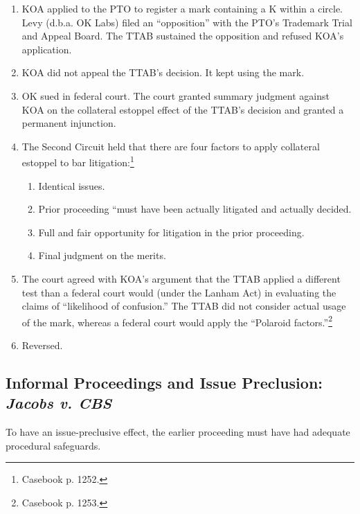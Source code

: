 \begin{enumerate}
    \item KOA applied to the PTO to register a mark containing a K within a 
    circle. Levy (d.b.a. OK Labs) filed an ``opposition'' with the PTO's 
    Trademark Trial and Appeal Board. The TTAB sustained the opposition and 
    refused KOA's application.
    \item KOA did not appeal the TTAB's decision. It kept using the mark.
    \item OK sued in federal court. The court granted summary judgment against 
    KOA on the collateral estoppel effect of the TTAB's decision and granted a 
    permanent injunction.
    \item The Second Circuit held that there are four factors to apply 
    collateral estoppel to bar litigation:\footnote{Casebook p. 1252.}
    \begin{enumerate}
        \item Identical issues.
        \item Prior proceeding ``must have been actually litigated and 
        actually decided.
        \item Full and fair opportunity for litigation in the prior 
        proceeding.
        \item Final judgment on the merits.
    \end{enumerate}
    \item The court agreed with KOA's argument that the TTAB applied a 
    different test than a federal court would (under the Lanham Act) in 
    evaluating the claims of ``likelihood of confusion.''  The TTAB did not 
    consider actual usage of the mark, whereas a federal court would apply the 
    ``Polaroid factors.''\footnote{Casebook p. 1253.}
    \item Reversed.
\end{enumerate}

\subsection{Informal Proceedings and Issue Preclusion: \emph{Jacobs v. CBS}}

To have an issue-preclusive effect, the earlier proceeding must have had 
adequate procedural safeguards.

